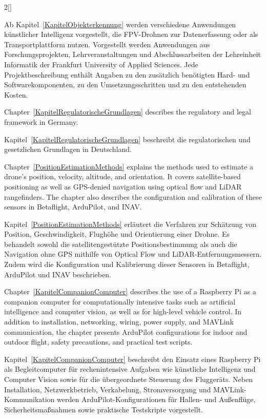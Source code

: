 \begin{paracol}{2}[]
\colger

Ab Kapitel~\ref{KapitelObjekterkennung} werden verschiedene Anwendungen künstlicher Intelligenz vorgestellt, die FPV-Drohnen zur Datenerfassung oder als Transportplattform nutzen. Vorgestellt werden Anwendungen aus Forschungsprojekten, Lehrveranstaltungen und Abschlussarbeiten der Lehreinheit Informatik der Frankfurt University of Applied Sciences. Jede Projektbeschreibung enthält Angaben zu den zusätzlich benötigten Hard- und Softwarekomponenten, zu den Umsetzungsschritten und zu den entstehenden Kosten.

\coleng

Chapter~\ref{KapitelRegulatorischeGrundlagen} describes the regulatory and legal framework in Germany.

\colger

Kapitel~\ref{KapitelRegulatorischeGrundlagen} beschreibt die regulatorischen und gesetzlichen Grundlagen in Deutschland.

\coleng

Chapter~\ref{PositionEstimationMethods} explains the methods used to estimate a drone's position, velocity, altitude, and orientation. It covers satellite-based positioning as well as GPS-denied navigation using optical flow and LiDAR rangefinders. The chapter also describes the configuration and calibration of these sensors in Betaflight, ArduPilot, and INAV.

\colger

Kapitel~\ref{PositionEstimationMethods} erläutert die Verfahren zur Schätzung von Position, Geschwindigkeit, Flughöhe und Orientierung einer Drohne. Es behandelt sowohl die satellitengestützte Positionsbestimmung als auch die Navigation ohne GPS mithilfe von Optical Flow und LiDAR-Entfernungsmessern. Zudem wird die Konfiguration und Kalibrierung dieser Sensoren in Betaflight, ArduPilot und INAV beschrieben.

\coleng

Chapter~\ref{KapitelCompanionComputer} describes the use of a Raspberry Pi as a companion computer for computationally intensive tasks such as artificial intelligence and computer vision, as well as for high-level vehicle control. In addition to installation, networking, wiring, power supply, and MAVLink communication, the chapter presents ArduPilot configurations for indoor and outdoor flight, safety precautions, and practical test scripts.

\colger

Kapitel~\ref{KapitelCompanionComputer} beschreibt den Einsatz eines Raspberry Pi als Begleitcomputer für rechenintensive Aufgaben wie künstliche Intelligenz und Computer Vision sowie für die übergeordnete Steuerung des Fluggeräts. Neben Installation, Netzwerkbetrieb, Verkabelung, Stromversorgung und MAVLink-Kommunikation werden ArduPilot-Konfigurationen für Hallen- und Außenflüge, Sicherheitsmaßnahmen sowie praktische Testskripte vorgestellt.


\end{paracol}
